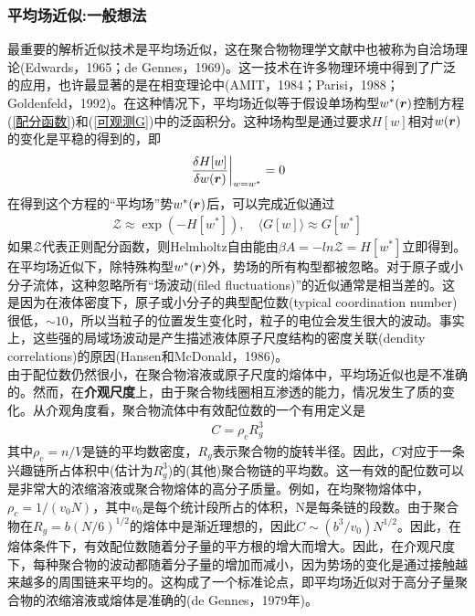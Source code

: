 \subsubsection{平均场近似:一般想法}
最重要的解析近似技术是平均场近似，这在聚合物物理学文献中也被称为自洽场理论(Edwards，1965；de Gennes，1969)。这一技术在许多物理环境中得到了广泛的应用，也许最显著的是在相变理论中(AMIT，1984；Parisi，1988；Goldenfeld，1992)。在这种情况下，平均场近似等于假设单场构型$w^*(\bm{r})$控制方程(\ref{配分函数})和(\ref{可观测G})中的泛函积分。这种场构型是通过要求$H[w]$相对$w(\bm{r})$的变化是平稳的得到的，即\\
\begin{gather}
	\left. \frac{\delta H[w]}{\delta w(\bm{r})}\right|_{w=w^*} =0 \label{H[w]相对w(r)的变化}
\end{gather}
在得到这个方程的“平均场”势$w^*(\bm{r})$后，可以完成近似通过\\
\begin{gather}
	\mathcal{Z} \approx \exp(-H[w^*]),\quad \langle G[w]\rangle \approx G[w^*]
\end{gather}
如果$\mathcal{Z}$代表正则配分函数，则Helmholtz自由能由$\beta A = -ln\mathcal{Z} = H[w^*]$立即得到。\\

在平均场近似下，除特殊构型$w^*(\bm{r})$外，势场的所有构型都被忽略。对于原子或小分子流体，这种忽略所有“场波动(filed fluctuations)”的近似通常是相当差的。这是因为在液体密度下，原子或小分子的典型配位数(typical coordination number)很低，$\sim 10$，所以当粒子的位置发生变化时，粒子的电位会发生很大的波动。事实上，这些强的局域场波动是产生描述液体原子尺度结构的密度关联(dendity correlations)的原因(Hansen和McDonald，1986)。\\

由于配位数仍然很小，在聚合物溶液或原子尺度的熔体中，平均场近似也是不准确的。然而，在\textbf{介观尺度}上，由于聚合物线圈相互渗透的能力，情况发生了质的变化。从介观角度看，聚合物流体中有效配位数的一个有用定义是\\
\begin{gather}
	C=\rho_c R_g^3
\end{gather}
其中$\rho_c=n/V$是链的平均数密度，$R_g$表示聚合物的旋转半径。因此，$C$对应于一条兴趣链所占体积中(估计为$R_g^3$)的(其他)聚合物链的平均数。这一有效的配位数可以是非常大的浓缩溶液或聚合物熔体的高分子质量。例如，在均聚物熔体中，$\rho_c=1/(v_0N)$，其中$v_0$是每个统计段所占的体积，N是每条链的段数。由于聚合物在$R_g=b(N/6)^{1/2}$的熔体中是渐近理想的，因此$C\sim (b^3/v_0)N^{1/2}$。因此，在熔体条件下，有效配位数随着分子量的平方根的增大而增大。因此，在介观尺度下，每种聚合物的波动都随着分子量的增加而减小，因为势场的变化是通过接触越来越多的周围链来平均的。这构成了一个标准论点，即平均场近似对于高分子量聚合物的浓缩溶液或熔体是准确的(de Gennes，1979年)。\\


